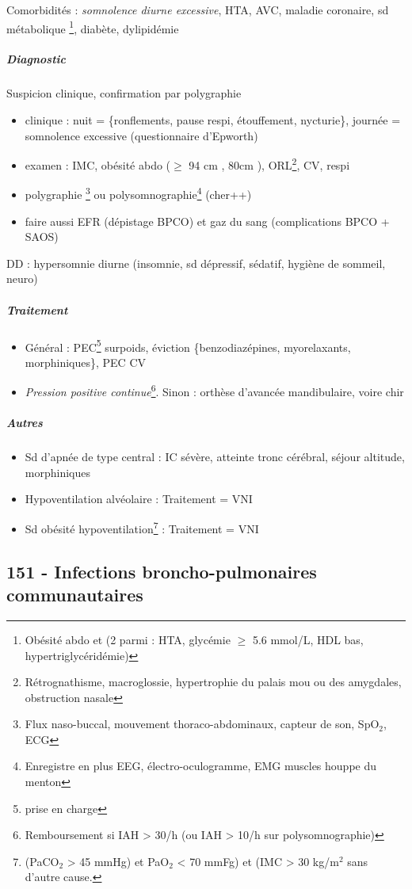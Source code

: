 \documentclass[11pt]{article}
\begin{document}
Comorbidités : \emph{somnolence diurne excessive}, HTA, AVC, maladie coronaire, sd
métabolique \footnote{Obésité abdo et (2 parmi : HTA, glycémie \(\ge\) 5.6 mmol/L, HDL bas, hypertriglycéridémie)}, diabète, dylipidémie
\subparagraph{Diagnostic}
\label{sec:org9be3d8b}
Suspicion clinique, confirmation par polygraphie 
\begin{itemize}
\item clinique : nuit = \{ronflements, pause respi, étouffement, nycturie\}, journée =
somnolence excessive (questionnaire d'Epworth)
\item examen : IMC, obésité abdo (\(\ge\) 94 cm \male, 80cm \female), ORL\footnote{Rétrognathisme, macroglossie, hypertrophie du palais mou ou des
amygdales, obstruction nasale}, CV, respi
\item polygraphie \footnote{Flux naso-buccal, mouvement thoraco-abdominaux, capteur de son, SpO\(_{\text{2}}\), ECG} ou polysomnographie\footnote{Enregistre en plus EEG, électro-oculogramme, EMG muscles houppe du menton} (cher++)
\item faire aussi EFR (dépistage BPCO) et gaz du sang (complications BPCO + SAOS)
\end{itemize}
DD : hypersomnie diurne (insomnie, sd dépressif, sédatif, hygiène de sommeil, neuro)
\subparagraph{Traitement}
\label{sec:org7ef53c4}
\begin{itemize}
\item Général : PEC\footnote{prise en charge} surpoids, éviction \{benzodiazépines, myorelaxants, morphiniques\}, PEC CV
\item \emph{Pression positive continue}\footnote{Remboursement si IAH > 30/h (ou IAH > 10/h sur polysomnographie)}. Sinon : orthèse d'avancée mandibulaire, voire chir
\end{itemize}

\subparagraph{Autres}
\label{sec:org44dcf03}
\begin{itemize}
\item Sd d'apnée de type central : IC sévère, atteinte tronc cérébral, séjour altitude, morphiniques
\item Hypoventilation alvéolaire : Traitement = VNI
\item Sd obésité hypoventilation\footnote{(PaCO\(_{\text{2}}\) > 45 mmHg) et PaO\(_{\text{2}}\) < 70 mmFg) et (IMC > 30 kg/m\(^{\text{2}}\) sans d'autre cause.} : Traitement = VNI
\end{itemize}

\subsection{151 \textdagger{} - Infections broncho-pulmonaires communautaires}
\label{sec:orga594e76}
\end{document}
